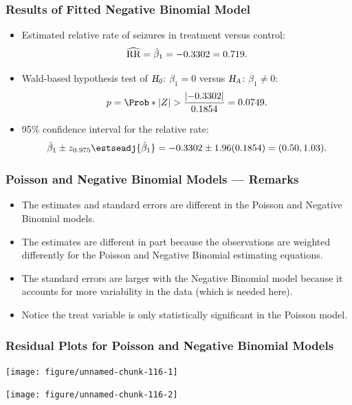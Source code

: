 \documentclass[oneside]{book}\usepackage[]{graphicx}\usepackage[svgnames]{xcolor}
\newenvironment{knitrout}{}{} %
\let\exp\relax%
\newcommand{\HN}{\textsl{H}_{\textsl{0}}}%
\newcommand{\HA}{\textsl{H}_{\textsl{A}}}%
\newcommand{\RR}{\text{RR}}%
\DeclarePairedDelimiter\abs{\lvert}{\rvert}
\begin{document}
\subsubsection*{Results of Fitted Negative Binomial Model}
\begin{itemize}
      \item Estimated relative rate of seizures in treatment versus control:
            \[ \widehat{\RR}=\exp{\hat{\beta}_1}=\exp{-0.3302}=0.719. \]
      \item Wald-based hypothesis test of $ \HN $: $ \beta_1=0 $ versus $ \HA $: $ \beta_1\ne 0 $:
            \[ p=\Prob*{\abs{Z}>\frac{\abs{-0.3302}}{0.1854}}=0.0749. \]
      \item 95\% confidence interval for the relative rate:
            \[ \exp{\hat{\beta}_1\pm z_{0.975}\estseadj{\hat{\beta}_1}}=\exp{-0.3302\pm 1.96(0.1854)}=(0.50,1.03). \]
\end{itemize}
\subsubsection*{Poisson and Negative Binomial Models --- Remarks}
\begin{itemize}
      \item The estimates and standard errors are different in the Poisson and Negative
            Binomial models.
      \item The estimates are different in part because the observations are weighted
            differently for the Poisson and Negative Binomial estimating equations.
      \item The standard errors are larger with the Negative Binomial model because it
            accounts for more variability in the data (which is needed here).
      \item Notice the treat variable is only statistically significant in the Poisson model.
\end{itemize}
\subsubsection*{Residual Plots for Poisson and Negative Binomial Models}
\begin{knitrout}
\color{fgcolor}

{\centering \texttt{[image: figure/unnamed-chunk-116-1]} 

}




{\centering \texttt{[image: figure/unnamed-chunk-116-2]} 

}


\end{knitrout}
\end{document}
